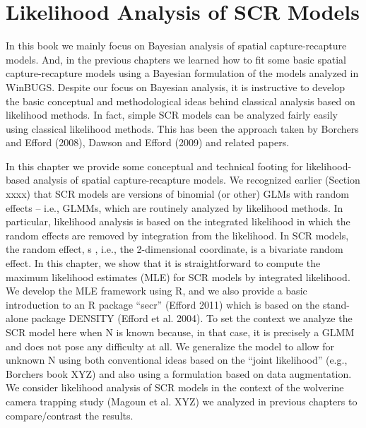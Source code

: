 \chapter{
Likelihood Analysis of SCR Models
}
\label{chapt.closed}



\vspace{.3in}



In this book we mainly focus on Bayesian analysis of spatial
capture-recapture models. And, in the previous chapters we learned how
to fit some basic spatial capture-recapture models using a Bayesian
formulation of the models analyzed in WinBUGS.  Despite our focus on
Bayesian analysis, it is instructive to develop the basic conceptual
and methodological ideas behind classical analysis based on likelihood
methods. In fact, simple SCR models can be analyzed fairly easily
using classical likelihood methods. This has been the approach taken
by Borchers and Efford (2008), Dawson and Efford (2009) and related
papers.

In this chapter we provide some conceptual and technical footing for
likelihood-based analysis of spatial capture-recapture models. We
recognized earlier (Section xxxx) that SCR models are versions of
binomial (or other) GLMs with random effects – i.e., GLMMs, which are
routinely analyzed by likelihood methods. In particular, likelihood
analysis is based on the integrated likelihood in which the random
effects are removed by integration from the likelihood. In SCR models,
the random effect, s , i.e., the 2-dimensional coordinate, is a
bivariate random effect. In this chapter, we show that it is
straightforward to compute the maximum likelihood estimates (MLE) for
SCR models by integrated likelihood. We develop the MLE framework
using R, and we also provide a basic introduction to an R package
“secr” (Efford 2011) which is based on the stand-alone package DENSITY
(Efford et al. 2004).  To set the context we analyze the SCR model
here when N is known because, in that case, it is precisely a GLMM and
does not pose any difficulty at all. We generalize the model to allow
for unknown N using both conventional ideas based on the “joint
likelihood” (e.g., Borchers book XYZ) and also using a formulation
based on data augmentation.  We consider likelihood analysis of SCR
models in the context of the wolverine camera trapping study (Magoun
et al. XYZ) we analyzed in previous chapters to compare/contrast the
results.

